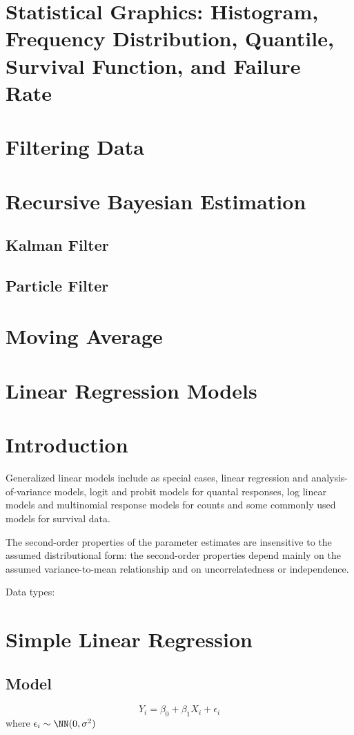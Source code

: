 \section{Statistical Graphics: Histogram, Frequency Distribution, Quantile, Survival Function, and Failure Rate}

\section{Filtering Data}
\section{Recursive Bayesian Estimation}
\subsection{Kalman Filter}
\subsection{Particle Filter}
\section{Moving Average}

\section{Linear Regression Models}
\section{Introduction}
Generalized linear models include as special cases,  linear regression and analysis-of-variance models, logit and probit models for quantal responses, log linear models and multinomial response models for counts and some commonly used models for survival data.

The second-order properties of the parameter estimates are insensitive to the assumed distributional form: the second-order properties depend mainly on the assumed variance-to-mean relationship and on uncorrelatedness or independence.

Data types:

\section{Simple Linear Regression}
\subsection{Model}
\begin{equation}
	Y_i = \beta_0 + \beta_1 X_i + \epsilon_i
\end{equation}
where $\epsilon_i \sim \NN(0,\sigma^2)$

